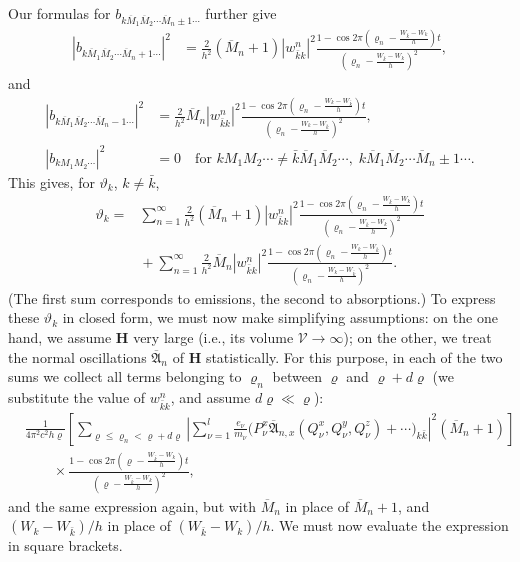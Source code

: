 \documentclass[fontsize=13pt,twoside,openany,headings=normal,parskip=false,bookmarkpackage=false,DIV=calc]{scrbook}
\begin{document}
\hypertarget{origpage-153}{}%
Our formulas for $b_{k\overline M_1\overline M_2\cdots\overline M_n\pm1\cdots}$ further give
\begin{align*}
 |b_{k\overline M_1\overline M_2\cdots\overline M_n+1\cdots}|^2
 &=\frac2{h^2}(\overline M_n+1)|w_{\bar k k}^n|^2
 \frac{1-\cos 2\pi\left(\varrho_n-\frac{W_{\bar k}-W_k}{h}\right)t}
 {\left(\varrho_n-\frac{W_{\bar k}-W_k}{h}\right)^2},
\end{align*}
and
\begin{align*}
 |b_{k\overline M_1\overline M_2\cdots\overline M_n-1\cdots}|^2
 &=\frac2{h^2}\overline M_n|w_{\bar k k}^n|^2
 \frac{1-\cos 2\pi\left(\varrho_n-\frac{W_k-W_{\bar k}}{h}\right)t}
 {\left(\varrho_n-\frac{W_k-W_{\bar k}}{h}\right)^2},\\
 |b_{kM_1M_2\cdots}|^2&=0
 \quad\text{for }kM_1M_2\cdots\ne\bar k\overline M_1\overline M_2\cdots,\;
 k\overline M_1\overline M_2\cdots\overline M_n\pm1\cdots.
\end{align*}
This gives, for $\vartheta_k$, $k\ne\bar k$,
\begin{align*}
 \vartheta_k={}&\sum_{n=1}^{\infty}\frac2{h^2}(\overline M_n+1)|w_{\bar k k}^n|^2
 \frac{1-\cos 2\pi\left(\varrho_n-\frac{W_{\bar k}-W_k}{h}\right)t}
 {\left(\varrho_n-\frac{W_{\bar k}-W_k}{h}\right)^2}\\
 &{}+\sum_{n=1}^{\infty}\frac2{h^2}\overline M_n|w_{\bar k k}^n|^2
 \frac{1-\cos 2\pi\left(\varrho_n-\frac{W_k-W_{\bar k}}{h}\right)t}
 {\left(\varrho_n-\frac{W_k-W_{\bar k}}{h}\right)^2}.
\end{align*}
(The first sum corresponds to emissions, the second to absorptions.) To express these $\vartheta_k$ in closed form, we must now make simplifying assumptions: on the one hand, we assume $\boldsymbol H$ very large (i.e., its volume $\mathcal V\longrightarrow\infty$); on the other, we treat the normal oscillations $\overline{\mathfrak A}_n$ of $\boldsymbol H$ statistically. For this purpose, in each of the two sums we collect all terms belonging to $\varrho_n$ between $\varrho$ and $\varrho+d\varrho$ (we substitute the value of $w_{\bar k k}^n$, and assume $d\varrho\ll\varrho$):
\begin{align*}
 &\frac1{4\pi^2c^2h\varrho}
 \left[\sum_{\varrho\le\varrho_n<\varrho+d\varrho}
 \left|\sum_{\nu=1}^{l}\frac{e_\nu}{m_\nu}
 \bigl(P_\nu^x\overline{\mathfrak A}_{n,x}(Q_\nu^x,Q_\nu^y,Q_\nu^z)+\cdots\bigr)_{k\bar k}\right|^2
 (\overline M_n+1)\right]\\
 &\qquad{}\times\frac{1-\cos2\pi\left(\varrho-\frac{W_{\bar k}-W_k}{h}\right)t}
 {\left(\varrho-\frac{W_{\bar k}-W_k}{h}\right)^2},
\end{align*}
and the same expression again, but with $\overline M_n$ in place of $\overline M_n+1$, and $(W_k-W_{\bar k})/h$ in place of $(W_{\bar k}-W_k)/h$. We must now evaluate the expression in square brackets.
\end{document}
